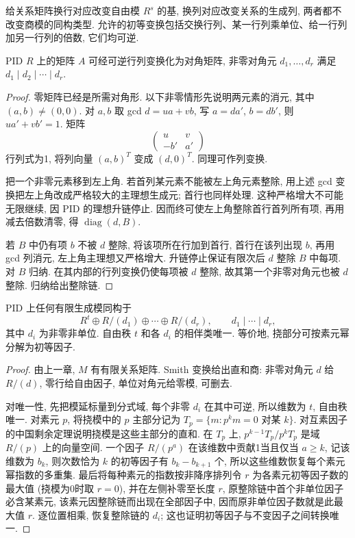 给关系矩阵换行对应改变自由模 $R^s$ 的基, 换列对应改变关系的生成列, 两者都不改变商模的同构类型. 允许的初等变换包括交换行列、某一行列乘单位、给一行列加另一行列的倍数, 它们均可逆.
\begin{theorem}\label{thm:smith}
PID $R$ 上的矩阵 $A$ 可经可逆行列变换化为对角矩阵, 非零对角元 $d_1,\ldots,d_r$ 满足 $d_1\mid d_2\mid\cdots\mid d_r$.
\end{theorem}
\begin{proof}
零矩阵已经是所需对角形. 以下非零情形先说明两元素的消元, 其中 $(a,b)\ne(0,0)$. 对 $a,b$ 取 gcd $d=ua+vb$, 写 $a=da'$, $b=db'$, 则 $ua'+vb'=1$. 矩阵
\[
\begin{pmatrix}u&v\\-b'&a'\end{pmatrix}
\]
行列式为1, 将列向量 $(a,b)^T$ 变成 $(d,0)^T$. 同理可作列变换.

把一个非零元素移到左上角. 若首列某元素不能被左上角元素整除, 用上述 gcd 变换把左上角改成严格较大的主理想生成元; 首行也同样处理. 这种严格增大不可能无限继续, 因 PID 的理想升链停止. 因而终可使左上角整除首行首列所有项, 再用减去倍数清零, 得 $\operatorname{diag}(d,B)$.

若 $B$ 中仍有项 $b$ 不被 $d$ 整除, 将该项所在行加到首行, 首行在该列出现 $b$, 再用 gcd 列消元, 左上角主理想又严格增大. 升链停止保证有限次后 $d$ 整除 $B$ 中每项. 对 $B$ 归纳. 在其内部的行列变换仍使每项被 $d$ 整除, 故其第一个非零对角元也被 $d$ 整除. 归纳给出整除链.
\end{proof}
\begin{theorem}\label{thm:module}
PID 上任何有限生成模同构于
\[
R^t\oplus R/(d_1)\oplus\cdots\oplus R/(d_r),\qquad d_1\mid\cdots\mid d_r,
\]
其中 $d_i$ 为非零非单位. 自由秩 $t$ 和各 $d_i$ 的相伴类唯一. 等价地, 挠部分可按素元幂分解为初等因子.
\end{theorem}
\begin{proof}
由上一章, $M$ 有有限关系矩阵. Smith 变换给出直和商: 非零对角元 $d$ 给 $R/(d)$, 零行给自由因子, 单位对角元给零模, 可删去.

对唯一性, 先把模延标量到分式域, 每个非零 $d_i$ 在其中可逆, 所以维数为 $t$, 自由秩唯一. 对素元 $p$, 将挠模中的 $p$ 主部分记为 $T_p=\{m:p^k m=0\text{ 对某 }k\}$. 对互素因子的中国剩余定理说明挠模是这些主部分的直和. 在 $T_p$ 上, $p^{k-1}T_p/p^kT_p$ 是域 $R/(p)$ 上的向量空间. 一个因子 $R/(p^a)$ 在该维数中贡献1当且仅当 $a\ge k$, 记该维数为 $b_k$, 则次数恰为 $k$ 的初等因子有 $b_k-b_{k+1}$ 个, 所以这些维数恢复每个素元幂指数的多重集. 最后将每种素元的指数按非降序排列令 $r$ 为各素元初等因子数的最大值 (挠模为0时取 $r=0$), 并在左侧补零至长度 $r$, 原整除链中首个非单位因子必含某素元, 该素元因整除链而出现在全部因子中, 因而原非单位因子数就是此最大值 $r$. 逐位置相乘, 恢复整除链的 $d_i$; 这也证明初等因子与不变因子之间转换唯一.
\end{proof}

